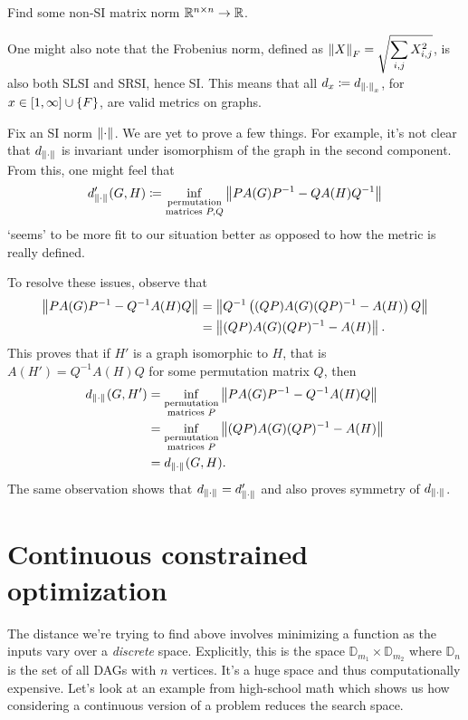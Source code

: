 \begin{qs}
Find some non-SI matrix norm $\mathbb{R}^{n\times n}\to \mathbb{R}$.
\end{qs}

One might also note that the Frobenius norm, defined as $\displaystyle \left\lVert X \right\rVert_{F} = \sqrt{\sum\limits_{i,j}X_{i,j}^2}$, is also both SLSI and SRSI, hence SI. This means that all $d_x \coloneqq d_{\left\lVert \cdot \right\rVert_{x}}$, for $x\in [1,\infty]\cup\left\{F\right\}$, are valid metrics on graphs. 

Fix an SI norm ${\left\lVert \cdot \right\rVert_{}}$. We are yet to prove a few things. For example, it's not clear that $d_{\left\lVert \cdot \right\rVert_{}}$ is invariant under isomorphism of the graph in the second component. From this, one might feel that $$d'_{\left\lVert \cdot \right\rVert_{}}(G,H)\coloneqq \inf_{\substack{\text{permutation}\\\text{matrices }P,Q}}\left\lVert PA(G)P^{-1}-QA(H)Q^{-1} \right\rVert_{}$$ `seems' to be more fit to our situation better as opposed to how the metric is really defined.

To resolve these issues, observe that \begin{align*} 
\left\lVert PA(G)P^{-1}-Q^{-1}A(H)Q \right\rVert_{} &= 
\left\lVert Q^{-1}\left((QP)A(G)(QP)^{-1}-A(H)\right)Q \right\rVert_{} \\
&= \left\lVert (QP)A(G)(QP)^{-1}-A(H) \right\rVert_{}.\end{align*} 
This proves that if $H'$ is a graph isomorphic to $H$, that is $A(H') = Q^{-1}A(H)Q$ for some permutation matrix $Q$, then \begin{align*} d_{\left\lVert \cdot \right\rVert_{}}(G,H') &=
\inf_{\substack{\text{permutation}\\\text{matrices }P}}\left\lVert PA(G)P^{-1}-Q^{-1}A(H)Q \right\rVert_{} \\
&= \inf_{\substack{\text{permutation}\\\text{matrices }P}}\left\lVert (QP)A(G)(QP)^{-1}-A(H) \right\rVert_{} \\
&= d_{\left\lVert \cdot \right\rVert_{}}(G,H).\end{align*}
The same observation shows that $d_{\left\lVert \cdot \right\rVert_{}} = d_{\left\lVert \cdot \right\rVert_{}}'$ and also proves symmetry of $d_{\left\lVert \cdot \right\rVert_{}}$.

\section{Continuous constrained optimization}

The distance we're trying to find above involves minimizing a function as the inputs vary over a \textit{discrete} space. Explicitly, this is the space $\mathbb D_{m_1}\times \mathbb D_{m_2}$ where $\mathbb D_n$ is the set of all DAGs with $n$ vertices. It's a huge space and thus computationally expensive. Let's look at an example from high-school math which shows us how considering a continuous version of a problem reduces the search space.

